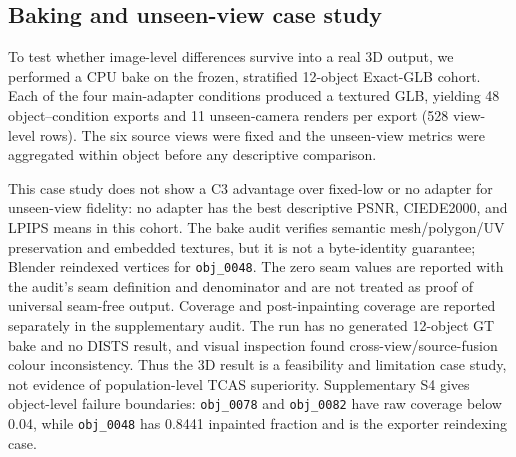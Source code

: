 \documentclass[times,twocolumn,final]{elsarticle}
\begin{document}
\FloatBarrier

\subsection{Baking and unseen-view case study}
\label{subsec:baking}

To test whether image-level differences survive into a real 3D output, we
performed a CPU bake on the frozen, stratified 12-object Exact-GLB cohort.
Each of the four main-adapter conditions produced a textured GLB, yielding 48
object--condition exports and 11 unseen-camera renders per export (528
view-level rows). The six source views were fixed and the unseen-view metrics
were aggregated within object before any descriptive comparison.

\begin{table}[t]
\centering
\caption{Descriptive unseen-view baking metrics for the 12-object stratified case study. These values are not a population estimate; DISTS was unavailable.}
\label{tab:bake12}
\small
{}
\end{table}

This case study does not show a C3 advantage over fixed-low or no adapter for
unseen-view fidelity: no adapter has the best descriptive PSNR, CIEDE2000, and
LPIPS means in this cohort. The bake audit verifies semantic mesh/polygon/UV
preservation and embedded textures, but it is not a byte-identity guarantee;
Blender reindexed vertices for \texttt{obj\_0048}. The zero seam values are
reported with the audit's seam definition and denominator and are not treated
as proof of universal seam-free output. Coverage and post-inpainting coverage
are reported separately in the supplementary audit. The run has no generated
12-object GT bake and no DISTS result, and visual inspection found
cross-view/source-fusion colour inconsistency. Thus the 3D result is a
feasibility and limitation case study, not evidence of population-level TCAS
superiority. Supplementary S4 gives object-level failure boundaries:
\texttt{obj\_0078} and \texttt{obj\_0082} have raw coverage below 0.04, while
\texttt{obj\_0048} has 0.8441 inpainted fraction and is the exporter
reindexing case.
\end{document}
